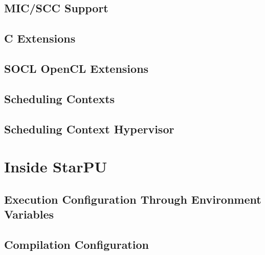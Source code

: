 \documentclass{book}
\begin{document}
\chapter{MIC/SCC Support}
\label{MICSCCSupport}
\hypertarget{MICSCCSupport}{}


\chapter{C Extensions}
\label{cExtensions}
\hypertarget{cExtensions}{}


\chapter{SOCL OpenCL Extensions}
\label{SOCLOpenclExtensions}
\hypertarget{SOCLOpenclExtensions}{}


\chapter{Scheduling Contexts}
\label{SchedulingContexts}
\hypertarget{SchedulingContexts}{}


\chapter{Scheduling Context Hypervisor}
\label{SchedulingContextHypervisor}
\hypertarget{SchedulingContextHypervisor}{}


\part{Inside StarPU}

\chapter{Execution Configuration Through Environment Variables}
\label{ExecutionConfigurationThroughEnvironmentVariables}
\hypertarget{ExecutionConfigurationThroughEnvironmentVariables}{}


\chapter{Compilation Configuration}
\label{CompilationConfiguration}
\hypertarget{CompilationConfiguration}{}

\end{document}
